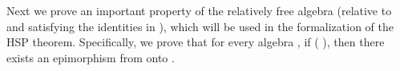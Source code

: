 \begin{code}
\AgdaSymbol{)}\<%
\\
%
\>[1]\AgdaSpace{}%
\AgdaSymbol{\{}\AgdaSpace{}%
\AgdaSymbol{=}\AgdaSpace{}%
\AgdaSymbol{\}}\AgdaSpace{}%
\AgdaSymbol{\{}\AgdaSpace{}%
\AgdaOperator{\AgdaInductiveConstructor{,}}\AgdaSpace{}%
\AgdaSymbol{\}}\AgdaSpace{}%
\AgdaSpace{}%
\AgdaSpace{}%
\AgdaSpace{}%
\AgdaSymbol{=}\AgdaSpace{}%
\AgdaSpace{}%
\AgdaSpace{}%
\AgdaSymbol{\{}\AgdaSpace{}%
\AgdaSymbol{=}\AgdaSpace{}%
\AgdaSymbol{\}\{}\AgdaSymbol{\}}\AgdaSpace{}%
\AgdaSymbol{(}\AgdaSpace{}%
\AgdaSymbol{)}\AgdaSpace{}%
\AgdaSpace{}%
\<%
\\
\>[1][@{}l@{\AgdaIndent{0}}]%
\>[2]\<%
\\
%
\>[2]\AgdaSpace{}%
\AgdaSymbol{:}\AgdaSpace{}%
\AgdaSpace{}%
\AgdaSymbol{\}}\AgdaSpace{}%
\AgdaSpace{}%
\AgdaSymbol{(}\AgdaSpace{}%
\AgdaSymbol{)}\AgdaSpace{}%
\AgdaSpace{}%
\AgdaSpace{}%
\AgdaSpace{}%
\AgdaSpace{}%
\AgdaSpace{}%
\AgdaSpace{}%
\AgdaSpace{}%
\AgdaSpace{}%
\AgdaSpace{}%
\AgdaSpace{}%
\AgdaSpace{}%
\<%
\\
%
\>[2]\AgdaSpace{}%
\AgdaSpace{}%
\AgdaSpace{}%
\AgdaSpace{}%
\AgdaSymbol{=}\AgdaSpace{}%
\AgdaSpace{}%
\AgdaSpace{}%
\AgdaSpace{}%
\AgdaSpace{}%
\AgdaSpace{}%
\AgdaSpace{}%
\AgdaSpace{}%
\AgdaSpace{}%
\AgdaSymbol{)}\AgdaSpace{}%
\AgdaSpace{}%
\AgdaSpace{}%
\AgdaSpace{}%
\AgdaSpace{}%
\AgdaSymbol{(}\AgdaSpace{}%
\AgdaSymbol{)}\AgdaSpace{}%
\<%
\\
\>[0]\<%
\end{code}
Next we prove an important property of the relatively free algebra
(relative to  and satisfying the identities in  ),
which will be used in the formalization of the HSP theorem. Specifically,
we prove that for every algebra , if    ( ),
then there exists an epimorphism from  onto .

